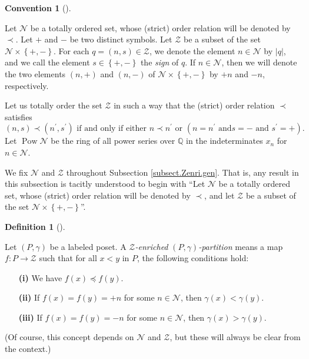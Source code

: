 \documentclass[numbers=enddot,12pt,final,onecolumn,notitlepage]{scrartcl}%
\theoremstyle{definition}
\newtheorem{defi}[theo]{Definition}
\newenvironment{definition}[1][]
{\begin{defi}[#1]\begin{leftbar}}
{\end{leftbar}\end{defi}}
\newtheorem{conv}[theo]{Convention}
\newenvironment{convention}[1][]
{\begin{conv}[#1]\begin{leftbar}}
{\end{leftbar}\end{conv}}
\newenvironment{convention}[1][Convention]{\noindent\textbf{#1.} }{\ \rule{0.5em}{0.5em}}
\begin{document}
\begin{convention}
Let $\mathcal{N}$ be a totally ordered set, whose (strict) order relation will
be denoted by $\prec$. Let $+$ and $-$ be two distinct symbols. Let
$\mathcal{Z}$ be a subset of the set $\mathcal{N}\times\left\{  +,-\right\}
$. For each $q=\left(  n,s\right)  \in\mathcal{Z}$, we denote the element
$n\in\mathcal{N}$ by $\left\vert q\right\vert $, and we call the element
$s\in\left\{  +,-\right\}  $ the \textit{sign} of $q$. If $n\in\mathcal{N}$,
then we will denote the two elements $\left(  n,+\right)  $ and $\left(
n,-\right)  $ of $\mathcal{N}\times\left\{  +,-\right\}  $ by $+n$ and $-n$, respectively.

Let us totally order the set $\mathcal{Z}$ in such a way that the (strict)
order relation $\prec$ satisfies%
\[
\left(  n,s\right)  \prec\left(  n^{\prime},s^{\prime}\right)  \text{ if and
only if either }n\prec n^{\prime}\text{ or }\left(  n=n^{\prime}\text{ and
}s=-\text{ and }s^{\prime}=+\right)  .
\]
Let $\operatorname*{Pow}\mathcal{N}$ be the ring of all power series over
$\mathbb{Q}$ in the indeterminates $x_{n}$ for $n\in\mathcal{N}$.

We fix $\mathcal{N}$ and $\mathcal{Z}$ throughout Subsection
\ref{subsect.Zenri.gen}. That is, any result in this subsection is tacitly
understood to begin with \textquotedblleft Let $\mathcal{N}$ be a totally
ordered set, whose (strict) order relation will be denoted by $\prec$, and let
$\mathcal{Z}$ be a subset of the set $\mathcal{N}\times\left\{  +,-\right\}
$\textquotedblright.
\end{convention}

\begin{definition}
\label{def.ambivPp}Let $\left(  P,\gamma\right)  $ be a labeled poset. A
\textit{$\mathcal{Z}$-enriched }$\left(  P,\gamma\right)  $\textit{-partition}
means a map $f:P\rightarrow\mathcal{Z}$ such that for all $x<y$ in $P$, the
following conditions hold:

\begin{enumerate}
\item[\textbf{(i)}] We have $f\left(  x\right)  \preccurlyeq f\left(
y\right)  $.

\item[\textbf{(ii)}] If $f\left(  x\right)  =f\left(  y\right)  =+n$ for some
$n\in\mathcal{N}$, then $\gamma\left(  x\right)  <\gamma\left(  y\right)  $.

\item[\textbf{(iii)}] If $f\left(  x\right)  =f\left(  y\right)  =-n$ for some
$n\in\mathcal{N}$, then $\gamma\left(  x\right)  >\gamma\left(  y\right)  $.
\end{enumerate}

(Of course, this concept depends on $\mathcal{N}$ and $\mathcal{Z}$, but these
will always be clear from the context.)
\end{definition}
\end{document}
